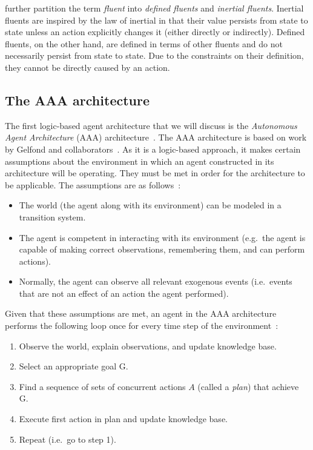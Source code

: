 \citet{gelfond_knowledge_2014} further partition the term \textit{fluent} into \textit{defined fluents} and \textit{inertial fluents}.
Inertial fluents are inspired by the law of inertial in that their value persists from state to state unless an action explicitly changes it (either directly or indirectly).
Defined fluents, on the other hand, are defined in terms of other fluents and do not necessarily persist from state to state.
Due to the constraints on their definition, they cannot be directly caused by an action.


\subsection{The AAA architecture}
\label{subsec:aaa_architecture}

The first logic-based agent architecture that we will discuss is the \textit{Autonomous Agent Architecture} (AAA) architecture~\citep{balduccini_aaa_2008}.
The AAA architecture is based on work by Gelfond and collaborators~\citep{baral_reasoning_2000,balduccini_diagnostic_2003, balduccini_answer_2006,balduccini_learning_2007}.
As it is a logic-based approach, it makes certain assumptions about the environment in which an agent constructed in its architecture will be operating.
They must be met in order for the architecture to be applicable.
The assumptions are as follows~\citep{balduccini_aaa_2008}:

\begin{itemize}
    \item The world (the agent along with its environment) can be modeled in a transition system.
    \item The agent is competent in interacting with its environment (e.g.~the agent is capable of making correct observations, remembering them, and can perform actions).
    \item Normally, the agent can observe all relevant exogenous events (i.e.~events that are not an effect of an action the agent performed).
\end{itemize}

Given that these assumptions are met, an agent in the AAA architecture performs the following loop once for every time step of the environment~\citep{balduccini_aaa_2008}:

\begin{enumerate}
    \item Observe the world, explain observations, and update knowledge base.
    \item Select an appropriate goal G.
    \item Find a sequence of sets of concurrent actions $A$ (called a \textit{plan}) that achieve G.
    \item Execute first action in plan and update knowledge base.
    \item Repeat (i.e.~go to step 1).
\end{enumerate}

